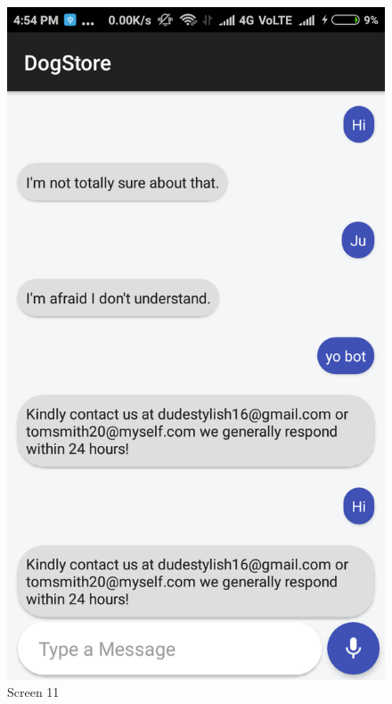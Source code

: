 \begin{figure}[ht]
\centering
\includegraphics[scale=0.30]{images/13.png}
\caption{Screen 11}
\end{figure}

\newpage

